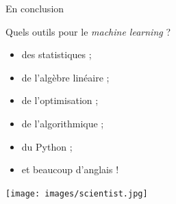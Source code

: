 \documentclass{beamer}
\begin{document}

\begin{frame}{En conclusion}

Quels outils pour le \textit{machine learning} ?

\begin{itemize}
\item des statistiques ;
\item de l'algèbre linéaire ;
\item de l'optimisation ;
\item de l'algorithmique ;
\item du Python ;
\item et beaucoup d'anglais !
\end{itemize}

\end{frame}

\begin{frame}[plain]
\begin{center}
\texttt{[image: images/scientist.jpg]}
\end{center}
\end{frame}
\end{document}
